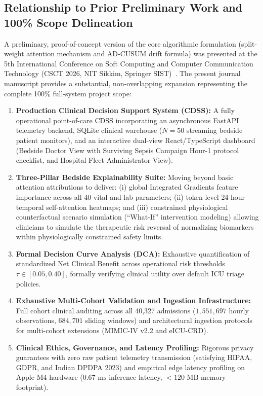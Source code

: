 \documentclass[final,5p,times,twocolumn]{elsarticle}
\begin{document}

\subsection{Relationship to Prior Preliminary Work and 100\% Scope Delineation}
A preliminary, proof-of-concept version of the core algorithmic formulation (split-weight attention mechanism and AD-CUSUM drift formula) was presented at the 5th International Conference on Soft Computing and Computer Communication Technology (CSCT 2026, NIT Sikkim, Springer SIST)~\cite{sakhi2026drift}. The present journal manuscript provides a substantial, non-overlapping expansion representing the complete 100\% full-system project scope:
\begin{enumerate}
    \item \textbf{Production Clinical Decision Support System (CDSS):} A fully operational point-of-care CDSS incorporating an asynchronous FastAPI telemetry backend, SQLite clinical warehouse ($N = 50$ streaming bedside patient monitors), and an interactive dual-view React/TypeScript dashboard (Bedside Doctor View with Surviving Sepsis Campaign Hour-1 protocol checklist, and Hospital Fleet Administrator View).
    \item \textbf{Three-Pillar Bedside Explainability Suite:} Moving beyond basic attention attributions to deliver: (i) global Integrated Gradients feature importance across all 40 vital and lab parameters; (ii) token-level 24-hour temporal self-attention heatmaps; and (iii) constrained physiological counterfactual scenario simulation (``What-If'' intervention modeling) allowing clinicians to simulate the therapeutic risk reversal of normalizing biomarkers within physiologically constrained safety limits.
    \item \textbf{Formal Decision Curve Analysis (DCA):} Exhaustive quantification of standardized Net Clinical Benefit across operational risk thresholds $\tau \in [0.05, 0.40]$, formally verifying clinical utility over default ICU triage policies.
    \item \textbf{Exhaustive Multi-Cohort Validation and Ingestion Infrastructure:} Full cohort clinical auditing across all 40,327 admissions ($1,551,697$ hourly observations, $684,701$ sliding windows) and architectural ingestion protocols for multi-cohort extensions (MIMIC-IV v2.2 and eICU-CRD).
    \item \textbf{Clinical Ethics, Governance, and Latency Profiling:} Rigorous privacy guarantees with zero raw patient telemetry transmission (satisfying HIPAA, GDPR, and Indian DPDPA 2023) and empirical edge latency profiling on Apple M4 hardware ($0.67\text{ ms}$ inference latency, $< 120\text{ MB}$ memory footprint).
\end{enumerate}
\end{document}
